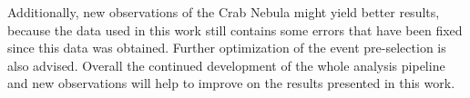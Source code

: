Additionally, new observations of the Crab Nebula might yield better results, because the data used in this work still contains some errors 
that have been fixed since this data was obtained.
Further optimization of the event pre-selection is also advised.
Overall the continued development of the whole analysis pipeline and new observations will help to improve on the results presented in this work.  